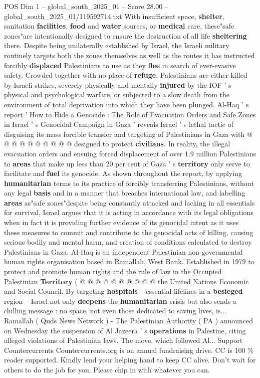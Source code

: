 \begin{textsample}{POS Dim 1 – global\_south\_2025\_01 – Score 28.00 – global\_south\_2025\_01/119592714.txt}
With insufficient space, \textbf{shelter}, sanitation \textbf{facilities}, \textbf{food} and \textbf{water} sources, or \textbf{medical} care, these"safe zones"are intentionally designed to ensure the destruction of all life \textbf{sheltering} there.
Despite being unilaterally established by Israel, the Israeli military routinely targets both the zones themselves as well as the routes it has instructed forcibly \textbf{displaced} Palestinians to use as they \textbf{flee} in search of ever-evasive safety.
Crowded together with no place of \textbf{refuge}, Palestinians are either killed by Israeli strikes, severely physically and mentally \textbf{injured} by the IOF ' s physical and psychological warfare, or subjected to a slow death from the environment of total deprivation into which they have been plunged.
Al-Haq ' s report ' How to Hide a Genocide : The Role of Evacuation Orders and Safe Zones in Israel ' s Genocidal Campaign in Gaza ' reveals Israel ' s lethal tactic of disguising its mass forcible transfer and targeting of Palestinians in Gaza with @ @ @ @ @ @ @ @ @ @ designed to protect \textbf{civilians}.
In reality, the illegal evacuation orders and ensuing forced displacement of over 1.9 million Palestinians to \textbf{areas} that make up less than 20 per cent of Gaza ' s \textbf{territory} only serve to facilitate and \textbf{fuel} its genocide.
As shown throughout the report, by applying \textbf{humanitarian} terms to its practice of forcibly transferring Palestinians, without any legal \textbf{basis} and in a manner that breaches international law, and labelling \textbf{areas} as"safe zones"despite being constantly attacked and lacking in all essentials for survival, Israel argues that it is acting in accordance with its legal obligations when in fact it is providing further evidence of its genocidal intent as it uses these measures to commit and contribute to the genocidal acts of killing, causing serious bodily and mental harm, and creation of conditions calculated to destroy Palestinians in Gaza.
Al-Haq is an independent Palestinian non-governmental human rights organisation based in Ramallah, West Bank.
Established in 1979 to protect and promote human rights and the rule of law in the Occupied Palestinian \textbf{Territory} ( @ @ @ @ @ @ @ @ @ @ the United Nations Economic and Social Council.
By targeting \textbf{hospitals} -- essential lifelines in a \textbf{besieged} region -- Israel not only \textbf{deepens} the \textbf{humanitarian} crisis but also sends a chilling message : no space, not even those dedicated to saving lives, is...
Ramallah ( Quds News Network ) - The Palestinian Authority ( PA ) announced on Wednesday the suspension of Al Jazeera ' s \textbf{operations} in Palestine, citing alleged violations of Palestinian laws.
The move, which followed Al...
Support Countercurrents Countercurrents.org is on annual fundraising drive.
CC is 100 \% reader supported.
Kindly lend your helping hand to keep CC alive.
Don't wait for others to do the job for you.
Please chip in with whatever you can.


\end{textsample}
